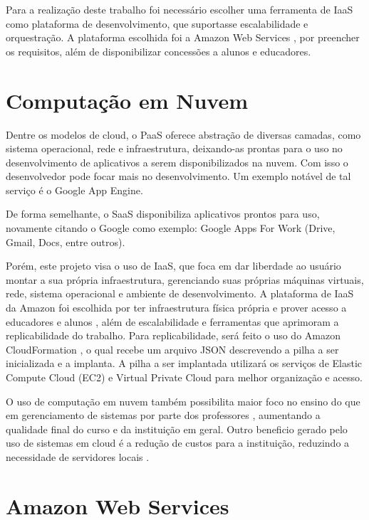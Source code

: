 \documentclass[tg]{mdtufsm}
\begin{document}
Para a realização deste trabalho foi necessário escolher uma ferramenta de IaaS como plataforma de desenvolvimento, que suportasse escalabilidade e orquestração. A plataforma escolhida foi a Amazon Web Services \cite{aws}, por preencher os requisitos, além de disponibilizar concessões a alunos e educadores.

\section{Computação em Nuvem}

Dentre os modelos de cloud, o PaaS oferece abstração de diversas camadas, como sistema operacional, rede e infraestrutura, deixando-as prontas para o uso no desenvolvimento de aplicativos a serem disponibilizados na nuvem. Com isso o desenvolvedor pode focar mais no desenvolvimento. Um exemplo notável de tal serviço é o Google App Engine.

De forma semelhante, o SaaS disponibiliza aplicativos prontos para uso, novamente citando o Google como exemplo: Google Apps For Work (Drive, Gmail, Docs, entre outros).

Porém, este projeto visa o uso de IaaS, que foca em dar liberdade ao usuário montar a sua própria infraestrutura, gerenciando suas próprias máquinas virtuais, rede, sistema operacional e ambiente de desenvolvimento. A plataforma de IaaS da Amazon foi escolhida por ter infraestrutura física própria e prover acesso a educadores e alunos \cite{awsedu}, além de escalabilidade e ferramentas que aprimoram a replicabilidade do trabalho. Para replicabilidade, será feito o uso do Amazon CloudFormation \cite{awscf}, o qual recebe um arquivo JSON descrevendo a pilha a ser inicializada e a implanta. A pilha a ser implantada utilizará os serviços de Elastic Compute Cloud (EC2)\cite{awsec2} e Virtual Private Cloud\cite{vpc} para melhor organização e acesso.

O uso de computação em nuvem também possibilita maior foco no ensino do que em gerenciamento de sistemas por parte dos professores \cite{cloudedu}, aumentando a qualidade final do curso e da instituição em geral. Outro beneficio gerado pelo uso de sistemas em cloud é a redução de custos para a instituição, reduzindo a necessidade de servidores locais \cite{toutcloud}.

\section{Amazon Web Services}
\end{document}
